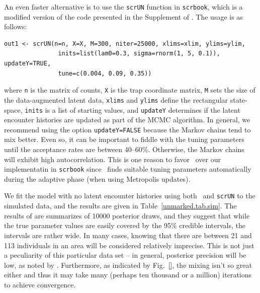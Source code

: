 An even faster alternative is to use the \verb+scrUN+ function in
\texttt{scrbook}, which is a modified version of the code presented in
the Supplement of \citet{chandler_royle:2012}. The usage is as
follows:
\begin{verbatim}
out1 <- scrUN(n=n, X=X, M=300, niter=25000, xlims=xlim, ylims=ylim,
               inits=list(lam0=0.3, sigma=rnorm(1, 5, 0.1)), updateY=TRUE,
               tune=c(0.004, 0.09, 0.35))
\end{verbatim}
where \verb+n+ is the matrix of counts, \verb+X+ is the trap
coordinate matrix, \verb+M+ sets the size of the data-augmented latent
data, \verb+xlims+ and \verb+ylims+ define the
rectangular state-space, \verb+inits+ is a list of starting values,
and \verb+updateY+ determines if the latent encounter histories are
updated as part of the MCMC algorithm. In general, %
we recommend using the option
\verb+updateY=FALSE+ because the Markov chains tend to mix
better. %
Even so, it can be important to fiddle with the tuning parameters until the
acceptance rates are between 40--60\%. Otherwise, the Markov chains
will exhibit high autocorrelation. This is one reason to favor
\jags~over our implementatin in \texttt{scrbook} since \jags~finds
suitable tuning parameters automatically during the adaptive phase
(when using Metropolis updates).

We fit the model with no latent encounter histories using both
\jags~and \verb+scrUN+ to the simulated data, and the results
are given in Table~\ref{unmarked.tab.sim}. The results of are
summarizes of 10000 posterior draws, and they suggest that while the
true parameter values are easily covered by the 95\% credible
intervals, the intervals are rather wide. In many cases, knowing that
there are between 21 and 113 individuals in an area will be considered
relatively imprecise.
This is not just a
peculiarity of this particular data set -- in general, posterior
precision will be low, as noted by
\citet{chandler_royle:2012}. Furthermore,
as indicated by
Fig.~\ref{}, the mixing isn't so great either and thus it may take
many (perhaps ten thousand or a million) iterations to achieve convergence.


